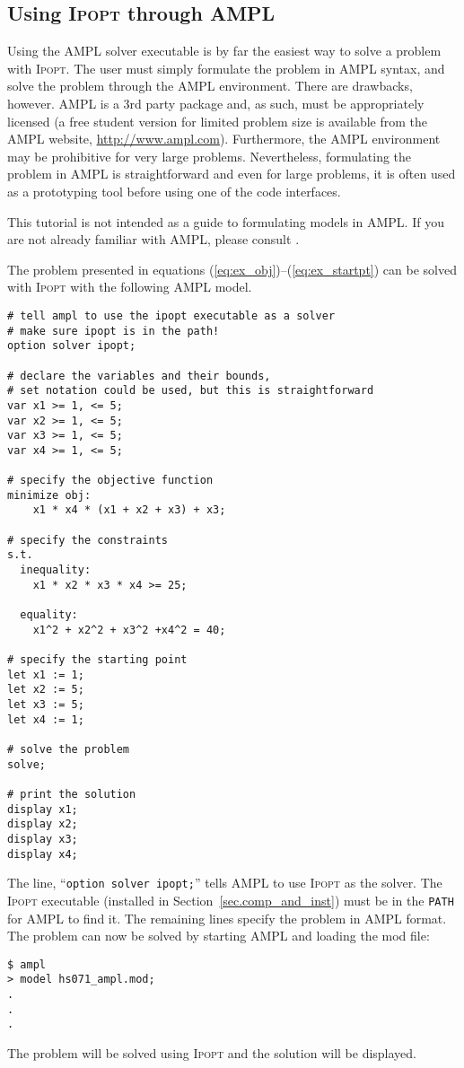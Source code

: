 \documentclass[10pt]{article}
\newcommand{\Ipopt}{\textsc{Ipopt}\xspace}
\begin{document}
\subsection{Using \Ipopt through AMPL} \label{sec.ipoptampl}
Using the AMPL solver executable is by far the easiest way to
solve a problem with \Ipopt. The user must simply formulate the problem
in AMPL syntax, and solve the problem through the AMPL environment.
There are drawbacks, however. AMPL is a 3rd party package and, as
such, must be appropriately licensed (a free student version for
limited problem size is available from the AMPL website,
\url{http://www.ampl.com}). Furthermore, the AMPL environment may be 
prohibitive for very large problems. Nevertheless, formulating the problem in 
AMPL is straightforward and even for large problems, it is often used as a
prototyping tool before using one of the code interfaces.

This tutorial is not intended as a guide to formulating models in
AMPL. If you are not already familiar with AMPL, please consult
\cite{FouGayKer:AMPLbook}.

The problem presented in equations
(\ref{eq:ex_obj})--(\ref{eq:ex_startpt}) can be solved with \Ipopt with
the following AMPL model.

\begin{verbatim}
# tell ampl to use the ipopt executable as a solver
# make sure ipopt is in the path!
option solver ipopt;

# declare the variables and their bounds, 
# set notation could be used, but this is straightforward
var x1 >= 1, <= 5; 
var x2 >= 1, <= 5; 
var x3 >= 1, <= 5; 
var x4 >= 1, <= 5;

# specify the objective function
minimize obj:
    x1 * x4 * (x1 + x2 + x3) + x3;
        
# specify the constraints
s.t.
  inequality:
    x1 * x2 * x3 * x4 >= 25;
                
  equality:
    x1^2 + x2^2 + x3^2 +x4^2 = 40;

# specify the starting point            
let x1 := 1;
let x2 := 5;
let x3 := 5;
let x4 := 1;

# solve the problem
solve;

# print the solution
display x1;
display x2;
display x3;
display x4;
\end{verbatim}
  
The line, ``{\tt option solver ipopt;}'' tells AMPL to use \Ipopt as
the solver. The \Ipopt executable (installed in
Section~\ref{sec.comp_and_inst}) must be in the {\tt PATH} for AMPL to
find it. The remaining lines specify the problem in AMPL format. The
problem can now be solved by starting AMPL and loading the mod file:
\begin{verbatim}
$ ampl
> model hs071_ampl.mod;
.
.
.
\end{verbatim}
The problem will be solved using \Ipopt and the solution will be
displayed.
\end{document}
